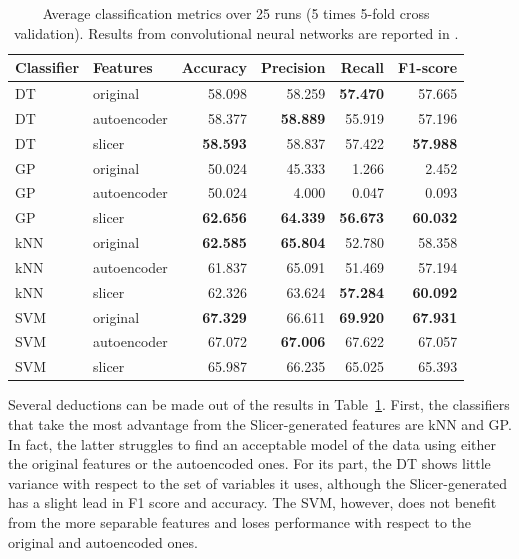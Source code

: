 \documentclass[
	fontsize=11pt, %
	twoside=false, %
	open=any, %
	secnumdepth=1, %
]{kaobook}
\begin{document}
\begin{table}[htbp]
    \centering
    
  \begin{tabular}{llrrrr}
\toprule
\bfseries Classifier & \bfseries Features & \bfseries Accuracy & \bfseries Precision & \bfseries Recall & \bfseries F1-score\\
\midrule
DT & original & 58.098 & 58.259 & \bfseries 57.470 & 57.665\\
DT & autoencoder & 58.377 & \bfseries 58.889 & 55.919 & 57.196\\
DT & slicer & \bfseries 58.593 & 58.837 & 57.422 & \bfseries 57.988\\
\addlinespace
GP & original & 50.024 & 45.333 & 1.266 & 2.452\\
GP & autoencoder & 50.024 & 4.000 & 0.047 & 0.093\\
GP & slicer & \bfseries 62.656 & \bfseries 64.339 & \bfseries 56.673 & \bfseries 60.032\\
\addlinespace
kNN & original & \bfseries 62.585 & \bfseries 65.804 & 52.780 & 58.358\\
kNN & autoencoder & 61.837 & 65.091 & 51.469 & 57.194\\
kNN & slicer & 62.326 & 63.624 & \bfseries 57.284 & \bfseries 60.092\\
\addlinespace
SVM & original & \bfseries 67.329 & 66.611 & \bfseries 69.920 & \bfseries 67.931\\
SVM & autoencoder & 67.072 & \bfseries 67.006 & 67.622 & 67.057\\
SVM & slicer & 65.987 & 66.235 & 65.025 & 65.393\\
\bottomrule
\end{tabular}

    \caption{Average classification metrics over 25 runs (5 times 5-fold cross validation). Results from convolutional neural networks are reported in \cite{9254002}.}
    \label{tab:meanspercl}
\end{table}

Several deductions can be made out of the results in Table~\ref{tab:meanspercl}. First, the classifiers that take the most advantage from the Slicer-generated features are kNN and GP. In fact, the latter struggles to find an acceptable model of the data using either the original features or the autoencoded ones. For its part, the DT shows little variance with respect to the set of variables it uses, although the Slicer-generated has a slight lead in F1 score and accuracy. The SVM, however, does not benefit from the more separable features and loses performance with respect to the original and autoencoded ones.
\end{document}
